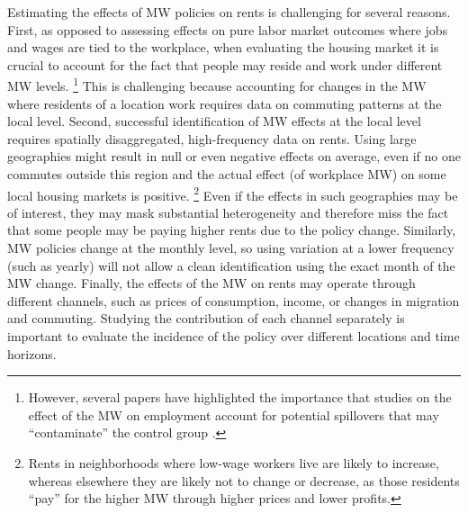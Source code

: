 Estimating the effects of MW policies on rents is challenging for several 
reasons.
First, as opposed to assessing effects on pure labor market outcomes where jobs 
and wages are tied to the workplace, when evaluating the housing market it is 
crucial to account for the fact that people may reside and work under different 
MW levels.%
\footnote{However, several papers have highlighted the importance that studies
on the effect of the MW on employment account for potential spillovers that may
``contaminate'' the control group \parencite{Kuehn2016, Huang2020}.}
This is challenging because accounting for changes in the MW where residents
of a location work requires data on commuting patterns at the local level.
Second, successful identification of MW effects at the local level requires 
spatially disaggregated, high-frequency data on rents.
Using large geographies might result in null or even negative effects on average,
even if no one commutes outside this region and the actual effect (of 
workplace MW) on some local housing markets is positive.%
\footnote{Rents in neighborhoods where low-wage workers live are likely to 
increase, whereas elsewhere they are likely not to change or decrease, 
as those residents ``pay'' for the higher MW through higher prices and lower 
profits.}
Even if the effects in such geographies may be of interest, they may mask 
substantial heterogeneity and therefore miss the fact that some people may be 
paying higher rents due to the policy change.
Similarly, MW policies change at the monthly level, so using variation at a lower
frequency (such as yearly) will not allow a clean identification using the exact 
month of the MW change.
Finally, the effects of the MW on rents may operate through different channels,
such as prices of consumption, income, or changes in migration and commuting.
Studying the contribution of each channel separately is important to evaluate
the incidence of the policy over different locations and time horizons.


